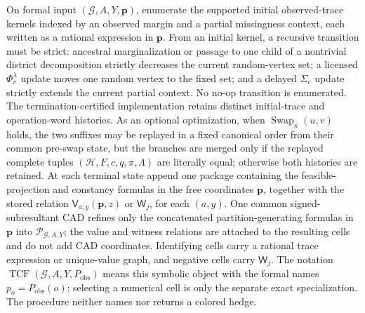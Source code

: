 On formal input \((\mathcal G,A,Y,\mathbf p)\), enumerate the supported initial observed-trace kernels indexed by an observed margin and a partial missingness context, each written as a rational expression in \(\mathbf p\). From an initial kernel, a recursive transition must be strict: ancestral marginalization or passage to one child of a nontrivial district decomposition strictly decreases the current random-vertex set; a licensed \(\Phi_v^{\lambda}\) update moves one random vertex to the fixed set; and a delayed \(\Sigma_c\) update strictly extends the current partial context. No no-op transition is enumerated. The termination-certified implementation retains distinct initial-trace and operation-word histories. As an optional optimization, when \(\operatorname{Swap}_{\kappa}(u,v)\) holds, the two suffixes may be replayed in a fixed canonical order from their common pre-swap state, but the branches are merged only if the replayed complete tuples \((\mathcal H,F,c,q,\pi,\Lambda)\) are literally equal; otherwise both histories are retained. At each terminal state append one package containing the feasible-projection and constancy formulas in the free coordinates \(\mathbf p\), together with the stored relation \(\mathsf V_{a,y}(\mathbf p,z)\) or \(\mathsf W_j\), for each \((a,y)\). One common signed-subresultant CAD refines only the concatenated partition-generating formulas in \(\mathbf p\) into \(\mathscr P_{\mathcal G,A,Y}\); the value and witness relations are attached to the resulting cells and do not add CAD coordinates. Identifying cells carry a rational trace expression or unique-value graph, and negative cells carry \(\mathsf W_j\). The notation \(\operatorname{TCF}(\mathcal G,A,Y,P_{\mathrm{obs}})\) means this symbolic object with the formal names \(p_o=P_{\mathrm{obs}}(o)\); selecting a numerical cell is only the separate exact specialization. The procedure neither names nor returns a colored hedge.